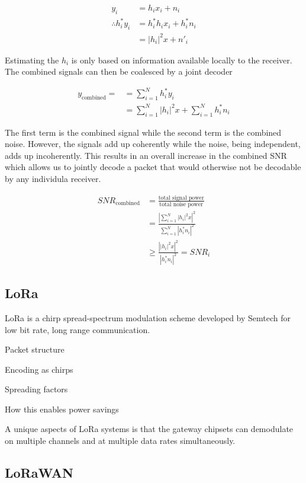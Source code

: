 \begin{align*}
y_i &= h_i x_i + n_i \\
\therefore h^*_i y_i &= h^*_i h_i x_i + h^*_i n_i \\
	&= \left| h_i \right|^2 x + n'_i
\end{align*}

Estimating the $h_i$ is only based on information available locally to the receiver.
The combined signals can then be coalesced by a joint decoder

\begin{align*}
y_{\text{combined}} = 
	&= \sum_{i=1}^N h^*_i y_i \\
	&= \sum_{i=1}^N \left| h_i \right|^2 x + \sum_{i=1}^N h^*_i n_i
\end{align*}

The first term is the combined signal while the second term is the combined
noise. However, the signals add up coherently while the noise, being
independent, adds up incoherently. This results in an overall increase in the
combined SNR which allows us to jointly decode a packet that would otherwise
not be decodable by any individula receiver.

\begin{align*}
SNR_{\text{combined}} &= \frac{\text{total signal power}}{\text{total noise power}} \\
	&= \frac{\left| \sum_{i=1}^N \left| h_i \right|^2 x \right|^2}{\sum_{i=1}^N \left| h^*_i n_i \right|^2} \\
	&\geq \frac{\left| \left| h_i \right|^2 x \right|^2}{\left| h^*_i n_i \right|^2} = SNR_i
\end{align*}

\subsection{LoRa}
\label{sec:lora}

LoRa is a chirp spread-spectrum modulation scheme developed by Semtech for low bit rate, long range communication.

{\color{blue}
Packet structure

Encoding as chirps

Spreading factors

How this enables power savings
}

A unique aspects of LoRa systems is that the gateway chipsets can demodulate on multiple channels and at multiple data rates simultaneously.

\subsection{LoRaWAN}
\label{sec:lorawan}

